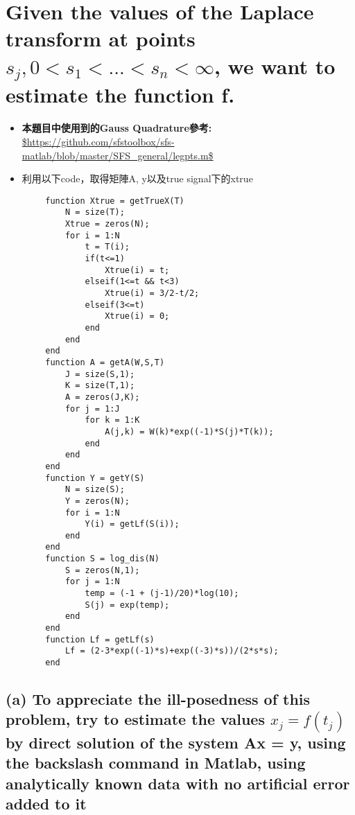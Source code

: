 \documentclass[12pt]{article}
\begin{document}
    \section{Given the values of the Laplace transform at points $s_j, 0 < s_1 < ...< s_n < \infty$,
            we want to estimate the function f.}
    \begin{itemize}
        \item \textbf{本題目中使用到的Gauss Quadrature參考: }
            \subitem \url{$https://github.com/sfstoolbox/sfs-matlab/blob/master/SFS_general/legpts.m$}
        \item 利用以下code，取得矩陣A, y以及true signal下的xtrue
    \end{itemize}
    \begin{lstlisting}
        function Xtrue = getTrueX(T)
            N = size(T);
            Xtrue = zeros(N);
            for i = 1:N 
                t = T(i);
                if(t<=1)
                    Xtrue(i) = t;
                elseif(1<=t && t<3)
                    Xtrue(i) = 3/2-t/2;
                elseif(3<=t)
                    Xtrue(i) = 0;
                end
            end
        end
        function A = getA(W,S,T)
            J = size(S,1);
            K = size(T,1);
            A = zeros(J,K);
            for j = 1:J
                for k = 1:K
                    A(j,k) = W(k)*exp((-1)*S(j)*T(k));
                end
            end
        end
        function Y = getY(S)
            N = size(S);
            Y = zeros(N);
            for i = 1:N 
                Y(i) = getLf(S(i));
            end
        end
        function S = log_dis(N)
            S = zeros(N,1);
            for j = 1:N 
                temp = (-1 + (j-1)/20)*log(10);
                S(j) = exp(temp);
            end
        end
        function Lf = getLf(s)
            Lf = (2-3*exp((-1)*s)+exp((-3)*s))/(2*s*s);
        end
    \end{lstlisting}
    \subsection*{(a) To appreciate the ill-posedness of this problem, try to estimate the values
        $x_j = f(t_j)$ by direct solution of the system Ax = y, using the backslash
        command in Matlab, using analytically known data with no artificial error
        added to it}
\end{document}

